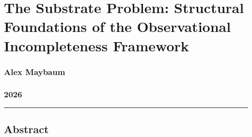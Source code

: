 \documentclass[
  11pt,
]{article}
\author{}
\date{}
\begin{document}
\hypertarget{the-substrate-problem-structural-foundations-of-the-observational-incompleteness-framework}{%
\section{The Substrate Problem: Structural Foundations of the
Observational Incompleteness
Framework}\label{the-substrate-problem-structural-foundations-of-the-observational-incompleteness-framework}}

\hypertarget{alex-maybaum}{%
\subsubsection{Alex Maybaum}\label{alex-maybaum}}

\hypertarget{section}{%
\subsubsection{2026}\label{section}}

\begin{center}\rule{0.5\linewidth}{0.5pt}\end{center}

\hypertarget{abstract}{%
\subsection{Abstract}\label{abstract}}
\end{document}
